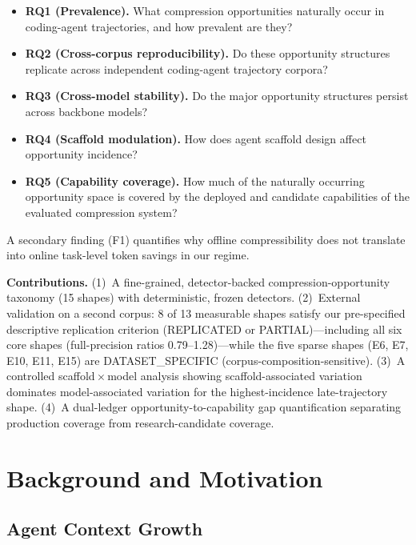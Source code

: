 ﻿\documentclass[sigconf,balance=false]{acmart}
\begin{document}
\begin{itemize}
\item \textbf{RQ1 (Prevalence).} What compression opportunities naturally occur in coding-agent trajectories, and how prevalent are they?
\item \textbf{RQ2 (Cross-corpus reproducibility).} Do these opportunity structures replicate across independent coding-agent trajectory corpora?
\item \textbf{RQ3 (Cross-model stability).} Do the major opportunity structures persist across backbone models?
\item \textbf{RQ4 (Scaffold modulation).} How does agent scaffold design affect opportunity incidence?
\item \textbf{RQ5 (Capability coverage).} How much of the naturally occurring opportunity space is covered by the deployed and candidate capabilities of the evaluated compression system?
\end{itemize}

A secondary finding (F1) quantifies why offline compressibility does not translate into online task-level token savings in our regime.

\textbf{Contributions.}
(1)~A fine-grained, detector-backed compression-opportunity taxonomy (15 shapes) with deterministic, frozen detectors.
(2)~External validation on a second corpus: 8 of 13 measurable shapes satisfy our pre-specified descriptive replication criterion (REPLICATED or PARTIAL)---including all six core shapes (full-precision ratios 0.79--1.28)---while the five sparse shapes (E6, E7, E10, E11, E15) are DATASET\_SPECIFIC (corpus-composition-sensitive).
(3)~A controlled scaffold\,$\times$\,model analysis showing scaffold-associated variation dominates model-associated variation for the highest-incidence late-trajectory shape.
(4)~A dual-ledger opportunity-to-capability gap quantification separating production coverage from research-candidate coverage.

\section{Background and Motivation}

\subsection{Agent Context Growth}
\end{document}
